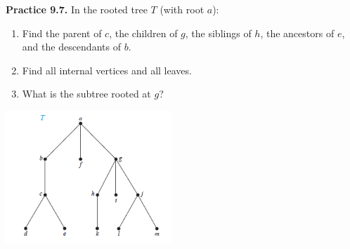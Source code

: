 \documentclass[aspectratio=169]{beamer}
\providecommand{\Blue}[1]{\textcolor{blue}{#1}}
\begin{document}

\begin{frame}[plain]{}
  
    {\bf Practice 9.7.} In the rooted tree $T$ (with root $a$):
      \begin{enumerate}
       \item Find the parent of $c$, the children of $g$, the siblings
	  of $h$, the ancestors of $e$, and the descendants of $b$.
	\item Find all internal vertices and all leaves.
	\item  What is the subtree rooted at $g$?
      \end{enumerate}
      \begin{center}
        \includegraphics[height=5cm]{./img/lecture9-fig5.png}
      \end{center}

\end{frame}
\end{document}
